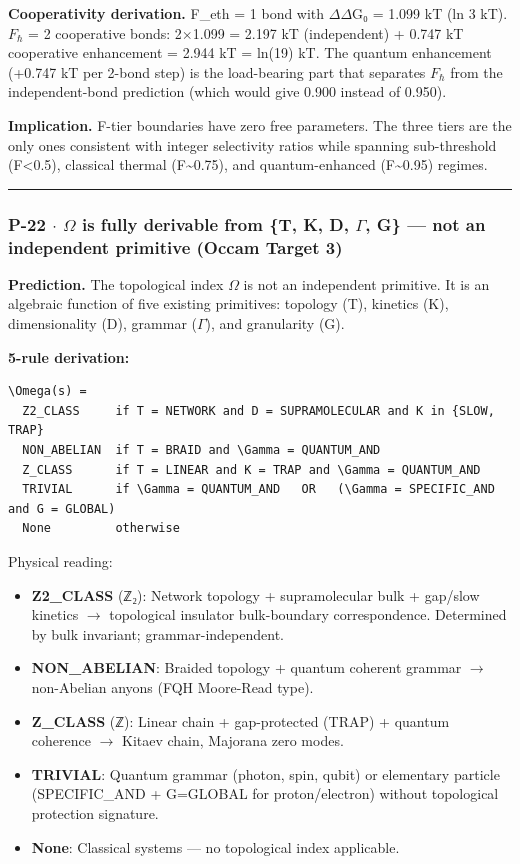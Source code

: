 \documentclass[12pt,a4paper]{article}
\begin{document}
\textbf{Cooperativity derivation.} F\_eth = 1 bond with $\Delta$$\Delta$G₀ = 1.099 kT (ln 3 kT). $F_{\hbar}$ = 2 cooperative bonds: 2$\times$1.099 = 2.197 kT (independent) + 0.747 kT cooperative enhancement = 2.944 kT = ln(19) kT. The quantum enhancement (+0.747 kT per 2-bond step) is the load-bearing part that separates $F_{\hbar}$ from the independent-bond prediction (which would give 0.900 instead of 0.950).

\textbf{Implication.} F-tier boundaries have zero free parameters. The three tiers are the only ones consistent with integer selectivity ratios while spanning sub-threshold (F\textless{}0.5), classical thermal (F\textasciitilde{}0.75), and quantum-enhanced (F\textasciitilde{}0.95) regimes.

\begin{center}
\rule{0.5\textwidth}{0.4pt}
\end{center}

\subsubsection{P-22 $\cdot$ $\Omega$ is fully derivable from \{T, K, D, $\Gamma$, G\} --- not an independent primitive (Occam Target 3)}

\textbf{Prediction.} The topological index $\Omega$ is not an independent primitive. It is an algebraic function of five existing primitives: topology (T), kinetics (K), dimensionality (D), grammar ($\Gamma$), and granularity (G).

\textbf{5-rule derivation:}

\begin{lstlisting}
\Omega(s) =
  Z2_CLASS     if T = NETWORK and D = SUPRAMOLECULAR and K in {SLOW, TRAP}
  NON_ABELIAN  if T = BRAID and \Gamma = QUANTUM_AND
  Z_CLASS      if T = LINEAR and K = TRAP and \Gamma = QUANTUM_AND
  TRIVIAL      if \Gamma = QUANTUM_AND   OR   (\Gamma = SPECIFIC_AND and G = GLOBAL)
  None         otherwise
\end{lstlisting}

Physical reading:

\begin{itemize}
    \item \textbf{Z2\_CLASS} (ℤ₂): Network topology + supramolecular bulk + gap/slow kinetics $\rightarrow$ topological insulator bulk-boundary correspondence. Determined by bulk invariant; grammar-independent.
    \item \textbf{NON\_ABELIAN}: Braided topology + quantum coherent grammar $\rightarrow$ non-Abelian anyons (FQH Moore-Read type).
    \item \textbf{Z\_CLASS} (ℤ): Linear chain + gap-protected (TRAP) + quantum coherence $\rightarrow$ Kitaev chain, Majorana zero modes.
    \item \textbf{TRIVIAL}: Quantum grammar (photon, spin, qubit) or elementary particle (SPECIFIC\_AND + G=GLOBAL for proton/electron) without topological protection signature.
    \item \textbf{None}: Classical systems --- no topological index applicable.
\end{itemize}
\end{document}
